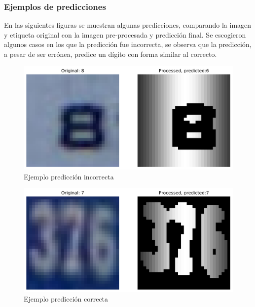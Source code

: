 \documentclass[journal]{IEEEtran}
\begin{document}
\subsubsection{Ejemplos de predicciones}
En las siguientes figuras se muestran algunas predicciones, comparando la imagen y etiqueta original con la imagen pre-procesada y predicción final. Se escogieron algunos casos en los que la predicción fue incorrecta, se observa que la predicción, a pesar de ser errónea, predice un dígito con forma similar al correcto.

\begin{figure}[H]
        \centering
        \includegraphics[width=\linewidth]{figures/pred_example_actual_8_pred_6.png}
        \caption{Ejemplo predicción incorrecta}
        \label{fig:Ejemplo1}
\end{figure}

\begin{figure}[H]
        \centering
        \includegraphics[width=\linewidth]{figures/pred_example_actual_7_pred_7.png}
        \caption{Ejemplo predicción correcta}
        \label{fig:Ejemplo2}
\end{figure}
\end{document}
